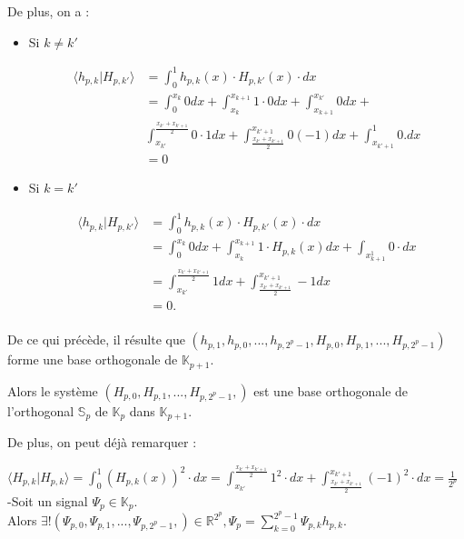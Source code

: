 \documentclass{article}
\begin{document}
De plus, on a :

\begin{itemize}

\item Si $k \neq k'$

\begin{align*}
\langle h_{p,k}|H_{p,k'} \rangle &= \int_{0}^1 h_{p,k}(x)\cdot{}H_{p,k'}(x)\cdot{dx} \\ 
&= \int_{0}^{x_k} 0 dx + \int_{x_k}^{x_{k+1}} 1\cdot{}0dx + \int_{x_{k+1}}^{x_{k'}} 0dx + \\
 &\int_{x_{k'}}^{\frac{x_{k'} + x_{k'+1} }{2}} 0\cdot{}1dx + \int_{\frac{x_{k'} + x_{k'+1} }{2}}^{x_{k'+1}} 0(-1)dx + \int_{x_{k'+1}}^{1} 0.dx \\
&= 0
\end{align*} 
\item Si $k =k'$

\begin{align*}
 \langle h_{p,k}|H_{p,k'} \rangle &= \int_{0}^1 h_{p,k}(x)\cdot{}H_{p,k'}(x)\cdot{dx} \\
&= \int_{0}^{x_k} 0dx + \int_{x_k}^{x_{k+1}} 1\cdot{}H_{p,k}(x)dx + \int_{x_{k+1}^1} 0\cdot{}dx \\
&= \int_{x_{k'}}^{\frac{x_{k'} + x_{k'+1} }{2}} 1dx + \int_{\frac{x_{k'} + x_{k'+1} }{2}}^{x_{k'+1}} -1dx \\
&= 0 . \\
\end{align*}
\end{itemize}

De ce qui précède, il résulte que $(h_{p,1},h_{p,0},...,h_{p,2^p - 1},H_{p,0},H_{p,1},...,H_{p,2^p - 1})$ forme une base orthogonale de $\mathbb{K}_{p+1}$.

Alors le système $(H_{p,0}, H_{p,1},..., H_{p,2^p - 1},)$ est une base orthogonale de l'orthogonal $\mathbb{S}_{p}$ de $\mathbb{K}_{p}$ dans $\mathbb{K}_{p+1}$.

De plus, on peut déjà remarquer :

$\displaystyle \langle H_{p,k}|H_{p,k} \rangle = \int_0^1 (H_{p,k}(x))^{2}\cdot{}dx = \int_{x_{k'}}^{\frac{x_{k'} + x_{k'+1} }{2}} 1^{2}\cdot{}dx + \int_{\frac{x_{k'} + x_{k'+1} }{2}}^{x_{k'+1}} (-1)^{2}\cdot{}dx = \frac{1}{2^p} $ \\


-Soit un signal $\Psi{}_{p} \in \mathbb{K}_{p}$. \\ Alors $\displaystyle \exists{}! (\Psi{}_{p,0},\Psi{}_{p,1},...,\Psi{}_{p,2^p - 1},) \in \mathbb{R}^{2^p}, \Psi{}_{p} = \sum_{k=0}^{2^p - 1} \Psi{}_{p,k}h_{p,k}$.
\end{document}
